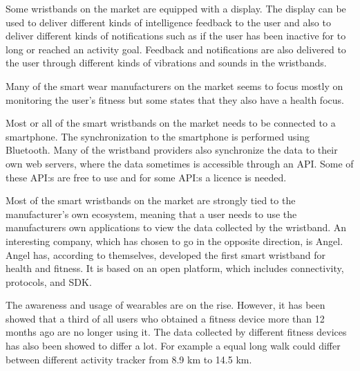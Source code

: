 \documentclass{cslthse-msc}
\begin{document}
Some wristbands on the market are equipped with a display. The display can be used to deliver different kinds of intelligence feedback to the user and also to deliver different kinds of notifications such as if the user has been inactive for to long or reached an activity goal.  Feedback and notifications are also delivered to the user through different kinds of vibrations and sounds in the wristbands. 

Many of the smart wear manufacturers on the market seems to focus mostly on monitoring the user’s fitness but some states that they also have a health focus.

Most or all of the smart wristbands on the market needs to be connected to a smartphone. The synchronization to the smartphone is performed using Bluetooth. Many of the wristband providers also synchronize the data to their own web servers, where the data sometimes is accessible through an API. Some of these API:s are free to use and for some API:s a licence is needed.%

Most of the smart wristbands on the market are strongly tied to the manufacturer’s own ecosystem, meaning that a user needs to use the manufacturers own applications to view the data collected by the wristband. An interesting company, which has chosen to go in the opposite direction, is Angel. Angel has, according to themselves\cite{angelfaq}, developed the first smart wristband for health and fitness. It is based on an open platform, which includes connectivity, protocols, and SDK. 

The awareness and usage of wearables are on the rise. However, it has been showed that a third of all users who obtained a fitness device more than 12 months ago are no longer using it. The data collected by different fitness devices has also been showed to differ a lot. For example a equal long walk could differ between different activity tracker from 8.9 km to 14.5 km\cite{wearable-technology-cannot-be-trusted}.

\end{document}
